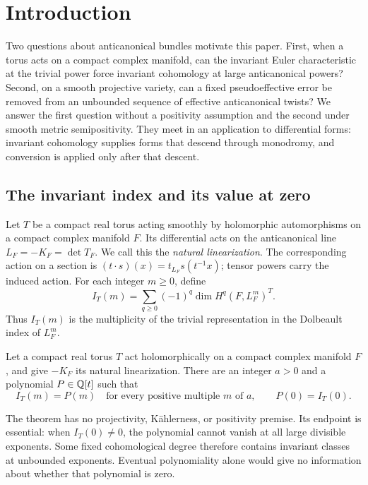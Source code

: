\section{Introduction}
\label{sec:introduction}

Two questions about anticanonical bundles motivate this paper. First,
when a torus acts on a compact complex manifold, can the invariant Euler
characteristic at the trivial power force invariant cohomology at large
anticanonical powers? Second, on a smooth projective variety, can a fixed
pseudoeffective error be removed from an unbounded sequence of effective
anticanonical twists? We answer the first question without a positivity
assumption and the second under smooth metric semipositivity. They meet
in an application to differential forms: invariant cohomology supplies
forms that descend through monodromy, and conversion is applied only
after that descent.

\subsection{The invariant index and its value at zero}

Let \(T\) be a compact real torus acting smoothly by holomorphic
automorphisms on a compact complex manifold \(F\). Its differential
acts on the anticanonical line \(L_F=-K_F=\det T_F\). We call this
the \emph{natural linearization}. The corresponding action on a section
is \((t\cdot s)(x)=t_{L_F}s(t^{-1}x)\); tensor powers carry the induced
action. For each integer \(m\ge0\), define
\[
I_T(m)=\sum_{q\ge0}(-1)^q\dim H^q(F,L_F^m)^T.
\]
Thus \(I_T(m)\) is the multiplicity of the trivial representation in the
Dolbeault index of \(L_F^m\).

\begin{theorem}\label{thm:index}
Let a compact real torus \(T\) act holomorphically on a compact complex
manifold \(F\), and give \(-K_F\) its natural linearization.
There are an integer \(a>0\) and a polynomial \(P\in\mathbb Q[t]\) such that
\[
I_T(m)=P(m)\quad\text{for every positive multiple \(m\) of \(a\)},
\qquad P(0)=I_T(0).
\]
\end{theorem}

The theorem has no projectivity, K\"ahlerness, or positivity premise.
Its endpoint is essential: when \(I_T(0)\ne0\), the polynomial cannot
vanish at all large divisible exponents. Some fixed cohomological degree
therefore contains invariant classes at unbounded exponents. Eventual
polynomiality alone would give no information about whether that
polynomial is zero.

